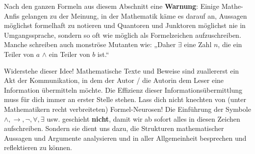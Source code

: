 \begin{bem}
    Nach den ganzen Formeln aus diesem Abschnitt eine \textbf{Warnung}: Einige Mathe-Anfis gelangen zu der Meinung, in der Mathematik käme es darauf an, Aussagen möglichst formelhaft zu notieren und Quantoren und Junktoren möglichst nie in Umgangssprache, sondern so oft wie möglich als Formelzeichen aufzuschreiben. Manche schreiben auch monströse Mutanten wie: „Daher $\exists$ eine Zahl $n$, die ein Teiler von $a$ $\land$ ein Teiler von $b$ ist.“
    
    Widerstehe dieser Idee! Mathematische Texte und Beweise sind zuallererst ein Akt der Kommunikation, in dem der Autor / die Autorin dem Leser eine Information übermitteln möchte. Die Effizienz dieser Informationsübermittlung muss für dich immer an erster Stelle stehen. Lass dich nicht knechten von (unter Mathematikern recht verbreiteten) Formel-Neurosen! Die Einführung der Symbole $\land,\to,\neg,\forall,\exists$ usw. geschieht \textbf{nicht}, damit wir ab sofort alles in diesen Zeichen aufschreiben. Sondern sie dient uns dazu, die Strukturen mathematischer Aussagen und Argumente analysieren und in aller Allgemeinheit besprechen und reflektieren zu können.
\end{bem}


